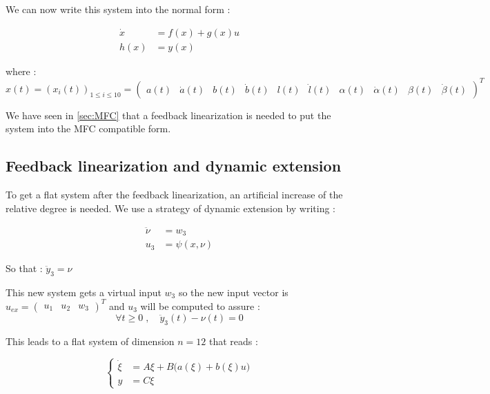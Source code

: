 We can now write this system into the normal form : 

\begin{align}
    \dot{x} &= f(x) + g(x)u \\
    h(x) &= y(x)
\end{align}

where : \begin{equation}
    x(t) = (x_i(t))_{1\le i\le 10} = \begin{pmatrix} a(t) & \dot{a}(t) & b(t) & \dot{b}(t) & l(t) & \dot{l}(t) & \alpha(t) & \dot{\alpha}(t) & \beta(t) & \dot{\beta}(t)\end{pmatrix}^T
\end{equation}

We have seen in \ref{sec:MFC} that a feedback linearization is needed to put the system into the MFC compatible form.

\subsection{Feedback linearization and dynamic extension}

To get a flat system after the feedback linearization, an artificial increase of the relative degree is needed. We use a strategy of dynamic extension by writing : 

\begin{align}
    \ddot{\nu} &= w_3 \\
    u_3 &= \psi(x, \nu)
\end{align}

So that : \(\ddot{y}_3 = \nu\)

This new system gets a virtual input \(w_3\) so the new input vector is \(u_{ex} = \begin{pmatrix} u_1 & u_2 & w_3 \end{pmatrix}^T\) and \(u_3\) will be computed to assure : 
\begin{equation}
    \forall t \ge 0 \; , \quad \ddot{y}_3(t) - \nu(t) = 0
\end{equation}

This leads to a flat system of dimension \(n = 12\) that reads : 

\begin{equation}
\left\{
\begin{aligned}
  \dot{\xi} &= A\xi + B\big(a(\xi) + b(\xi)u) \\
  y &= C\xi
\end{aligned}
\right.
\end{equation}

